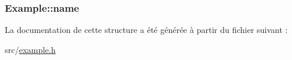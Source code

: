\subsubsection[{name}]{ Example\+::name}\label{struct_example_a3ff74d2063cc9dc8b836ce95e79af75d}


La documentation de cette structure a été générée à partir du fichier suivant \+:\begin{DoxyCompactItemize}
\item 
src/\hyperlink{example_8h}{example.\+h}\end{DoxyCompactItemize}
